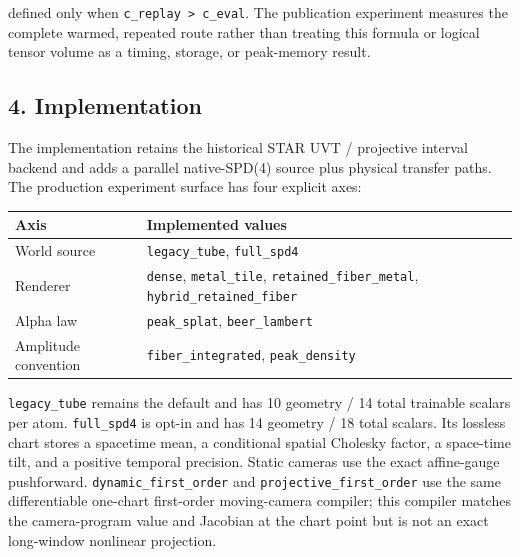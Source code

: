 \documentclass[
]{article}
\newcounter{none} %
\begin{document}
defined only when \texttt{c\_replay\ \textgreater{}\ c\_eval}. The
publication experiment measures the complete warmed, repeated route
rather than treating this formula or logical tensor volume as a timing,
storage, or peak-memory result.

\subsection{4. Implementation}\label{implementation}

The implementation retains the historical STAR UVT / projective interval
backend and adds a parallel native-SPD(4) source plus physical transfer
paths. The production experiment surface has four explicit axes:

{\def\LTcaptype{none} %
\begin{longtable}[]{@{}
  >{\raggedright\arraybackslash}p{}
  >{\raggedright\arraybackslash}p{}@{}}
\toprule\noalign{}
\begin{minipage}[b]{\linewidth}\raggedright
Axis
\end{minipage} & \begin{minipage}[b]{\linewidth}\raggedright
Implemented values
\end{minipage} \\
\midrule\noalign{}
\endhead
\bottomrule\noalign{}
\endlastfoot
World source & \texttt{legacy\_tube}, \texttt{full\_spd4} \\
Renderer & \texttt{dense}, \texttt{metal\_tile},
\texttt{retained\_fiber\_metal}, \texttt{hybrid\_retained\_fiber} \\
Alpha law & \texttt{peak\_splat}, \texttt{beer\_lambert} \\
Amplitude convention & \texttt{fiber\_integrated},
\texttt{peak\_density} \\
\end{longtable}
}

\texttt{legacy\_tube} remains the default and has 10 geometry / 14 total
trainable scalars per atom. \texttt{full\_spd4} is opt-in and has 14
geometry / 18 total scalars. Its lossless chart stores a spacetime mean,
a conditional spatial Cholesky factor, a space-time tilt, and a positive
temporal precision. Static cameras use the exact affine-gauge
pushforward. \texttt{dynamic\_first\_order} and
\texttt{projective\_first\_order} use the same differentiable one-chart
first-order moving-camera compiler; this compiler matches the
camera-program value and Jacobian at the chart point but is not an exact
long-window nonlinear projection.
\end{document}
